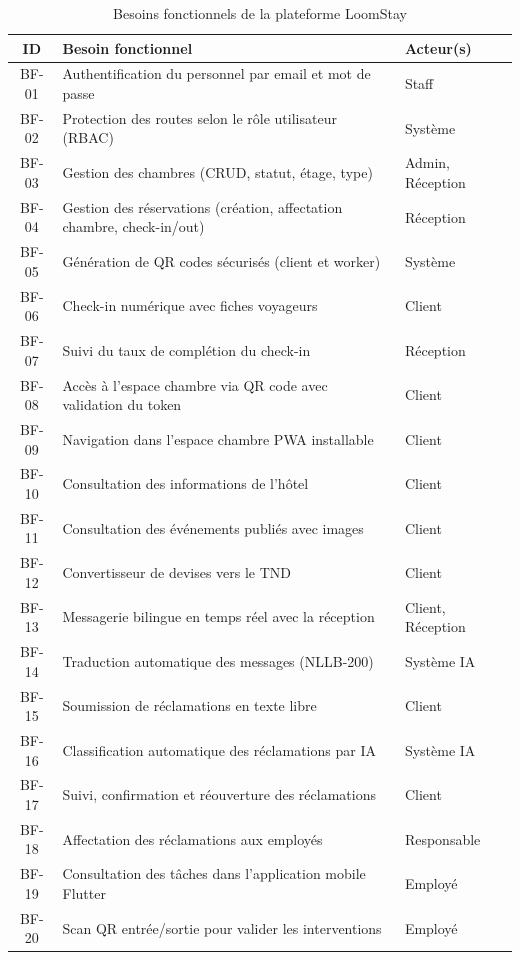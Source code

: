 \begin{table}[H]
\centering
\caption{Besoins fonctionnels de la plateforme LoomStay}
\small
\begin{tabularx}{\textwidth}{|c|X|p{3cm}|}
\hline
\textbf{ID} & \textbf{Besoin fonctionnel} & \textbf{Acteur(s)} \\ \hline
BF-01 & Authentification du personnel par email et mot de passe & Staff \\ \hline
BF-02 & Protection des routes selon le rôle utilisateur (RBAC) & Système \\ \hline
BF-03 & Gestion des chambres (CRUD, statut, étage, type) & Admin, Réception \\ \hline
BF-04 & Gestion des réservations (création, affectation chambre, check-in/out) & Réception \\ \hline
BF-05 & Génération de QR codes sécurisés (client et worker) & Système \\ \hline
BF-06 & Check-in numérique avec fiches voyageurs & Client \\ \hline
BF-07 & Suivi du taux de complétion du check-in & Réception \\ \hline
BF-08 & Accès à l'espace chambre via QR code avec validation du token & Client \\ \hline
BF-09 & Navigation dans l'espace chambre PWA installable & Client \\ \hline
BF-10 & Consultation des informations de l'hôtel & Client \\ \hline
BF-11 & Consultation des événements publiés avec images & Client \\ \hline
BF-12 & Convertisseur de devises vers le TND & Client \\ \hline
BF-13 & Messagerie bilingue en temps réel avec la réception & Client, Réception \\ \hline
BF-14 & Traduction automatique des messages (NLLB-200) & Système IA \\ \hline
BF-15 & Soumission de réclamations en texte libre & Client \\ \hline
BF-16 & Classification automatique des réclamations par IA & Système IA \\ \hline
BF-17 & Suivi, confirmation et réouverture des réclamations & Client \\ \hline
BF-18 & Affectation des réclamations aux employés & Responsable \\ \hline
BF-19 & Consultation des tâches dans l'application mobile Flutter & Employé \\ \hline
BF-20 & Scan QR entrée/sortie pour valider les interventions & Employé \\ \hline

\end{tabularx}
\end{table}
